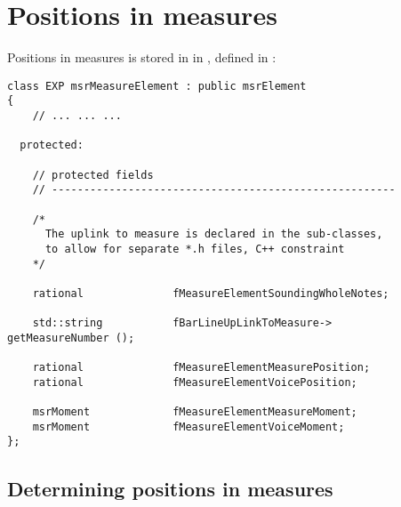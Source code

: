

\chapter{Positions in measures}

Positions in measures is stored in  in , defined in :
\begin{lstlisting}[language=CPlusPlus]
class EXP msrMeasureElement : public msrElement
{
	// ... ... ...

  protected:

    // protected fields
    // ------------------------------------------------------

    /*
      The uplink to measure is declared in the sub-classes,
      to allow for separate *.h files, C++ constraint
    */

    rational              fMeasureElementSoundingWholeNotes;

    std::string           fBarLineUpLinkToMeasure->
getMeasureNumber ();

    rational              fMeasureElementMeasurePosition;
    rational              fMeasureElementVoicePosition;

    msrMoment             fMeasureElementMeasureMoment;
    msrMoment             fMeasureElementVoiceMoment;
};
\end{lstlisting}

\section{Determining positions in measures}

